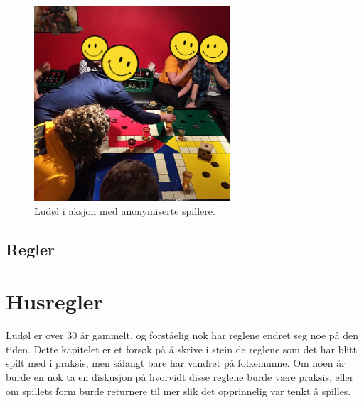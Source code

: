 \documentclass[10pt,a4paper,norsk,openany]{book}
\begin{document}
\begin{figure}[htbp!]
  \centering
  \includegraphics[width=0.65\textwidth]{ludol-live} 
  \caption{Ludøl i aksjon med anonymiserte spillere.}
  \label{fig:ludol-live}
\end{figure}

\newpage

\section{Regler} 




\chapter{Husregler}

Ludøl er over 30 år gammelt, og forståelig nok har reglene endret seg noe på den
tiden. Dette kapitelet er et forsøk på å skrive i stein de reglene som det har
blitt spilt med i praksis, men sålangt bare har vandret på folkemunne. Om noen
år burde en nok ta en diskusjon på hvorvidt disse reglene burde være praksis,
eller om spillets form burde returnere til mer slik det opprinnelig var tenkt å spilles.
\end{document}
